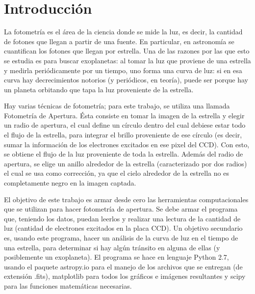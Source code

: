 \documentclass[a4paper, 11pt, spanish]{article}
\begin{document}
\clearpage


\newpage

\tableofcontents %
\listoffigures %

\newpage

\section{Introducci\'on}
La fotometr\'ia es el \'area de la ciencia donde se mide la luz, es decir, la cantidad de fotones que llegan a partir de una fuente. En particular, en astronom\'ia se cuantifican los fotones que llegan por estrella. Una de las razones por las que esto se estudia es para buscar exoplanetas: al tomar la luz que proviene de una estrella y medirla peri\'odicamente por un tiempo, uno forma una curva de luz: si en esa curva hay decrecimientos notorios (y peri\'odicos, en teor\'ia), puede ser porque hay un planeta orbitando que tapa la luz proveniente de la estrella. 

Hay varias t\'ecnicas de fotometr\'ia; para este trabajo, se utiliza una llamada Fotometr\'ia de Apertura. \'Esta consiste en tomar la imagen de la estrella y elegir un radio de apertura, el cual define un c\'irculo dentro del cual debiese estar todo el flujo de la estrella, para integrar el brillo proveniente de ese c\'irculo (es decir, sumar la informaci\'on de los electrones excitados en ese pixel del CCD). Con esto, se obtiene el flujo de la luz proveniente de toda la estrella. Adem\'as del radio de apertura, se elige un anillo alrededor de la estrella (caracterizado por dos radios) el cual se usa como correcci\'on, ya que el cielo alrededor de la estrella no es completamente negro en la imagen captada.


El objetivo de este trabajo es armar desde cero las herramientas computacionales que se utilizan para hacer fotometr\'ia de apertura. Se debe armar el programa que, teniendo los datos, puedan leerlos y realizar una lectura de la cantidad de luz (cantidad de electrones excitados en la placa CCD). Un objetivo secundario es, usando este programa, hacer un an\'alisis de la curva de luz en el tiempo de una estrella, para determinar si hay alg\'un tr\'ansito en alguna de ellas (y posiblemente un exoplaneta). El programa se hace en lenguaje Python 2.7, usando el paquete astropy.io para el manejo de los archivos que se entregan (de extensi\'on .fits), matplotlib para todos los gr\'aficos e im\'agenes resultantes y scipy para las funciones matem\'aticas necesarias. 
\end{document}
